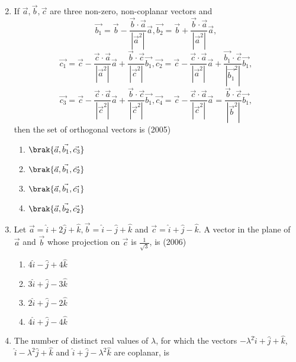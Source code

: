 \begin{enumerate}[label=\thesubsection.\arabic*.,ref=\thesubsection.\theenumi]
\begin{multicols}{4}
\begin{enumerate}
    	\end{enumerate}
    \end{multicols}
    \item If $\vec{a}, \vec{b}, \vec{c}$ are three non-zero, non-coplanar vectors and 
	    $$\vec{b_1} = \vec{b} - \frac{\vec{b} \cdot \vec{a}}{|\vec{a}^2|} \vec{a}, \vec{b_2} = \vec{b} + \frac{\vec{b} \cdot \vec{a}}{|\vec{a}^2|} \vec{a},
$$
$$	    \vec{c_1} = \vec{c} - \frac{\vec{c} \cdot \vec{a}}{|\vec{a}^2|} \vec{a} + \frac{\vec{b} \cdot \vec{c}}{|\vec{c}^2|} \vec{b_1}, \vec{c_2} = \vec{c} - \frac{\vec{c} \cdot \vec{a}}{|\vec{a}^2|} \vec{a} + \frac{\vec{b_1} \cdot \vec{c}}{|\vec{b_1}^2|} \vec{b_1},$$
$$\vec{c_3} = \vec{c} - \frac{\vec{c} \cdot \vec{a}}{|\vec{c}^2|} \vec{a} + \frac{\vec{b} \cdot \vec{c}}{|\vec{c}^2|} \vec{b_1}, \vec{c_4} = \vec{c} - \frac{\vec{c} \cdot \vec{a}}{|\vec{c}^2|} \vec{a} = \frac{\vec{b} \cdot \vec{c}}{|\vec{b}^2|} \vec{b_1},$$ 
%
then the set of orthogonal vectors is 
    \hfill{(2005)}
    \begin{multicols}{4}
    	\begin{enumerate}
    		\item $\brak{\vec{a}, \vec{b_1}, \vec{c_3}}$
    		\item $\brak{\vec{a}, \vec{b_1}, \vec{c_2}}$
    		\item $\brak{\vec{a}, \vec{b_1}, \vec{c_1}}$
    		\item $\brak{\vec{a}, \vec{b_2}, \vec{c_2}}$
    	\end{enumerate}
    \end{multicols}
    \item Let $\vec{a} = \hat{i} + 2\hat{j} + \hat{k}, \vec{b} = \hat{i}-\hat{j}+\hat{k}$  and  $\vec{c}= \hat{i}+\hat{j}-\hat{k}$. A vector in the plane of $\vec{a}$  and  $\vec{b}$ whose projection on $\vec{c}$ is $\frac{1}{\sqrt{3}}$, is
    \hfill{(2006)}
  \begin{multicols}{4}
    \begin{enumerate}
    	\item $4\hat{i} - \hat{j} + 4\hat{k}$
    	\item $3\hat{i} + \hat{j} - 3\hat{k}$
    	\item $2\hat{i} + \hat{j} - 2\hat{k}$
    	\item $4\hat{i} + \hat{j} - 4\hat{k}$
    \end{enumerate}
  \end{multicols}
    \item The number of distinct real values of $\lambda$, for which the vectors $-\lambda^{2}\hat{i} + \hat{j} + \hat{k}$, $\hat{i} - \lambda^{2}\hat{j} + \hat{k}$  and  $\hat{i} + \hat{j} - \lambda^{2}\hat{k}$ are coplanar, is

\end{enumerate}
